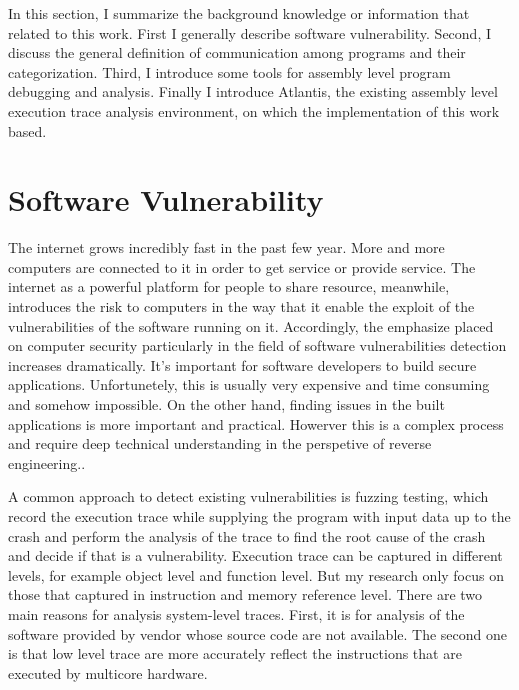 \label{chapter:Bac}
In this section, I summarize the background knowledge or information that related to this work. First I generally describe software vulnerability. Second, I discuss the general definition of communication among programs and their categorization. Third, I introduce some tools for assembly level program debugging and analysis. Finally I introduce Atlantis, the existing assembly level execution trace analysis environment, on which the implementation of this work based.

\section{Software Vulnerability}
The internet grows incredibly fast in the past few year. More and more computers are connected to it in order to get service or provide service. The internet as a powerful platform for people to share resource, meanwhile, introduces the risk to computers in the way that it enable the exploit of the vulnerabilities of the software running on it. Accordingly, the emphasize placed on computer security particularly in the field of software vulnerabilities detection increases dramatically. It's important for software developers to build secure applications. Unfortunetely, this is usually very expensive and time consuming and somehow impossible. On the other hand, finding issues in the built applications is more important and practical. Howerver this is a complex process and require deep technical understanding in the perspetive of reverse engineering.\cite{dowd_art_2006}.

A common approach to detect existing vulnerabilities is fuzzing testing, which record the execution trace while supplying the program with input data up to the crash and perform the analysis of the trace to find the root cause of the crash and decide if that is a vulnerability\cite{cleary_reconstructing_2013}. Execution trace can be captured in different levels, for example object level and function level. But my research only focus on those that captured in instruction and memory reference level. There are two main reasons for analysis system-level traces. First, it is for analysis of the software provided by vendor whose source code are not available. The second one is that low level trace are more accurately reflect the instructions that are executed by multicore hardware\cite{wang_predicting_2011}. 

